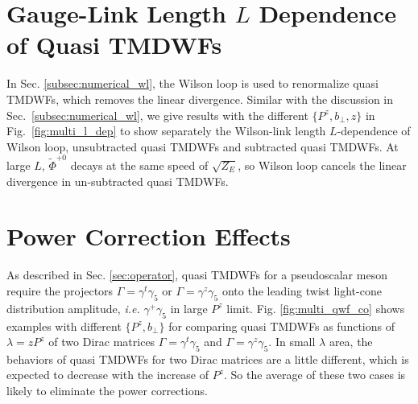 \documentclass[prd,aps,twocolumn,preprintnumbers, showpacs, nofootinbib,superscriptaddress,notitlepage]{revtex4-1}
\begin{document}
\section{Gauge-Link Length $L$ Dependence of Quasi TMDWFs}
\label{sec:gauge_line}

In Sec. \ref{subsec:numerical_wl}, the Wilson loop is used to renormalize quasi TMDWFs, which removes the linear divergence. Similar with the discussion in Sec.~\ref{subsec:numerical_wl}, we give results with the different $\{P^z,b_{\perp},z\}$ in Fig.~\ref{fig:multi_l_dep} to show separately the Wilson-link length $L$-dependence of Wilson loop, unsubtracted quasi TMDWFs and subtracted quasi TMDWFs. At large $L$, $\tilde{\Phi}^{+0}$ decays at the same speed of $\sqrt{Z_E}$, so Wilson loop cancels the linear divergence in un-subtracted quasi TMDWFs.

\section{Power Correction Effects}
\label{sec:app_operator_mixing}

As described in Sec. \ref{sec:operator}, quasi TMDWFs for a pseudoscalar meson require  the projectors $\Gamma=\gamma^t\gamma_5$ or $\Gamma=\gamma^z\gamma_5$ onto the leading twist light-cone distribution amplitude, {\it i.e.} $\gamma^+\gamma_5$ in large $P^z$ limit. Fig. \ref{fig:multi_qwf_co} shows examples with different $\{P^z,b_{\perp}\}$ for comparing quasi TMDWFs as functions of $\lambda=zP^z$ of two Dirac matrices $\Gamma=\gamma^t\gamma_5$ and $\Gamma=\gamma^z\gamma_5$. In small $\lambda$ area, the behaviors of quasi TMDWFs for two Dirac matrices are a little different, which is expected to decrease with the increase of $P^z$. So the average of these two cases is likely to eliminate the power corrections. 
\end{document}
